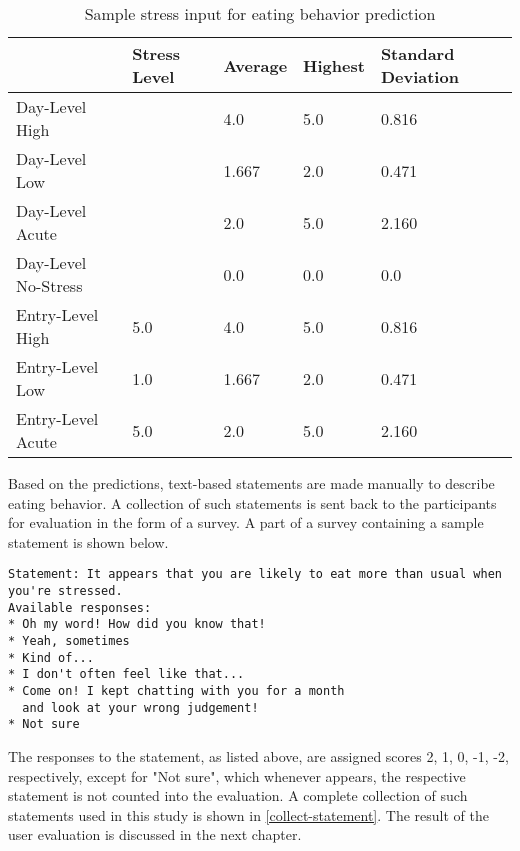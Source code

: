 \begin{table}[htpb]
  \caption[Sample Stress Input]{Sample stress input for eating behavior prediction}\label{tab:stress-sample}
  \centering
  \begin{tabular}{l l l l l}
    \toprule
      & Stress Level & Average & Highest & Standard Deviation \\
    \midrule
      Day-Level High & & 4.0 & 5.0 & 0.816 \\
      Day-Level Low & & 1.667 & 2.0 & 0.471 \\
      Day-Level Acute & & 2.0 & 5.0 & 2.160 \\
      Day-Level No-Stress & & 0.0 & 0.0 & 0.0 \\
      Entry-Level High & 5.0 & 4.0 & 5.0 & 0.816 \\
      Entry-Level Low & 1.0 & 1.667 & 2.0 & 0.471 \\
      Entry-Level Acute & 5.0 & 2.0 & 5.0 & 2.160 \\
    \bottomrule
  \end{tabular}
\end{table}

Based on the predictions, text-based statements are made manually to describe eating behavior. A collection of such statements is sent back to the participants for evaluation in the form of a survey. A part of a survey containing a sample statement is shown below.

\begin{lstlisting}
Statement: It appears that you are likely to eat more than usual when
you're stressed.
Available responses:
* Oh my word! How did you know that!
* Yeah, sometimes
* Kind of...
* I don't often feel like that...
* Come on! I kept chatting with you for a month
  and look at your wrong judgement!
* Not sure
\end{lstlisting}

\bigskip
The responses to the statement, as listed above, are assigned scores 2, 1, 0, -1, -2, respectively, except for "Not sure", which whenever appears, the respective statement is not counted into the evaluation. A complete collection of such statements used in this study is shown in \autoref{collect-statement}. The result of the user evaluation is discussed in the next chapter.

